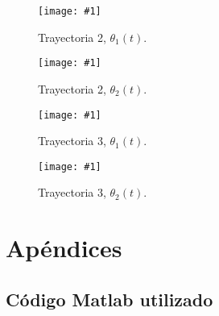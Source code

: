 \documentclass[paper=a4, fontsize=11pt]{scrreprt} %
\newlength{\imgwidth}
\newcommand\scalegraphics[1]{
    \settowidth{\imgwidth}{\texttt{[image: \#1]}}
    \setlength{\imgwidth}{\minof{\imgwidth}{\textwidth}}
    \texttt{[image: \#1]}
}
\numberwithin{equation}{section} %
\numberwithin{figure}{section} %
\numberwithin{table}{section} %
\begin{document}
    \begin{figure}
        \scalegraphics{imagenes/trayectoria-2-th1.png}
        \caption{Trayectoria 2, $\theta_1(t)$.}
        \label{f:3}
    \end{figure}
    \begin{figure}
        \scalegraphics{imagenes/trayectoria-2-th2.png}
        \caption{Trayectoria 2, $\theta_2(t)$.}
        \label{f:4}
    \end{figure}
    
    \begin{figure}
        \scalegraphics{imagenes/trayectoria-3-th1.png}
        \caption{Trayectoria 3, $\theta_1(t)$.}
        \label{f:5}
    \end{figure}
    
    \begin{figure}
        \scalegraphics{imagenes/trayectoria-3-th2.png}
        \caption{Trayectoria 3, $\theta_2(t)$.}
        \label{f:6}
    \end{figure}
    
    \part*{Apéndices}
    \appendix
    \chapter{Código Matlab utilizado}
    
    
    
    
    
    
\end{document}
